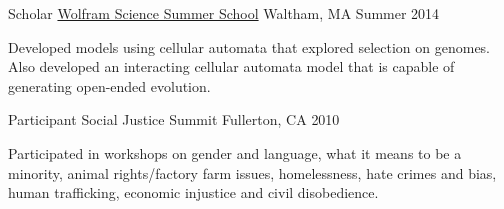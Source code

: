 \begin{cventries}
\cventry
    {Scholar}
    {\href{https://education.wolfram.com/summer-school}{Wolfram Science Summer School}}
    {Waltham, MA}
    {Summer 2014}
    {
    \begin{cvitems}
       \item {Developed models using cellular automata that explored selection on genomes. Also developed an interacting cellular automata model that is capable of generating open-ended evolution.}
    \end{cvitems}
    }
    
\cventry
    {Participant}
    {Social Justice Summit}
    {Fullerton, CA}
    {2010}
    {
    \begin{cvitems}
       \item {Participated in workshops on gender and language, what it means to be a minority, animal rights/factory farm issues, homelessness, hate crimes and bias, human trafficking, economic injustice and civil disobedience.}
    \end{cvitems}
    }
    
\end{cventries}